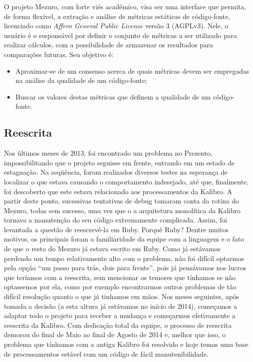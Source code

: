 \documentclass{llncs}
\begin{document}
O projeto Mezuro, com forte viés acadêmico, visa ser uma interface que permita, de forma flexível, a extração e análise de métricas estáticas de código-fonte, licenciado como \textit{Affero General Public License} versão 3 (AGPLv3). Nele, o usuário é o responsável por definir o conjunto de métricas a ser utilizado para realizar cálculos, com a possibilidade de armazenar os resultados para comparações futuras. Seu objetivo é:
\begin{itemize}
    \item Aproximar-se de um consenso acerca de quais métricas devem ser empregadas na análise da qualidade de um código-fonte;
    \item Buscar os valores destas métricas que definem a qualidade de um código-fonte.
\end{itemize}
\subsection{Reescrita}
Nos últimos meses de 2013, foi encontrado um problema no Prezento, impossibilitando que o projeto seguisse em frente, entrando em um estado de estagnação. Na seqüência, foram realizados diversos testes na esperança de localizar o que estava causando o comportamento indesejado, até que, finalmente, foi descoberto que este estava relacionado aos processamentos da Kalibro. A partir deste ponto, sucessivas tentativas de debug tomaram conta da rotina do Mezuro, todas sem sucesso, uma vez que o a arquitetura monolítica da Kalibro tornava a manutenção do seu código extremamente complicada. Assim, foi levantada a questão de reescrevê-la em Ruby. Porquê Ruby? Dentre muitos motivos, os principais foram a familiaridade da equipe com a linguagem e o fato de que o resto do Mezuro já estava escrito em Ruby. 
Como já estávamos perdendo um tempo relativamente alto com o problema, não foi difícil optarmos pela opção ``um passo para trás, dois para frente'', pois já pensávamos nos lucros que teríamos com a reescrita, sem mencionar os temores que tínhamos se não optassemos por ela, como por exemplo encontrarmos outros problemas de tão difícil resolução quanto o que já tinhamos em mãos. Nos meses seguintes, após tomada a decisão (a esta altura já estávamos no início de 2014), começamos a adaptar todo o projeto para receber a mudança e começarmos efetivamente a reescrita da Kalibro. 
Com dedicação total da equipe, o processo de reescrita demorou do final de Maio ao final de Agosto de 2014 e, melhor que isso, o problema que tínhamos com a antiga Kalibro foi resolvido e hoje temos uma base de processamentos estável com um código de fácil manutenibilidade.
\end{document}
